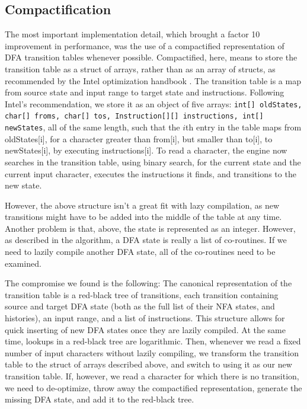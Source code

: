 \documentclass[english,twocolumn]{article}
\theoremstyle{definition}
\newcommand{\seclabel}[1]{\label{sec:#1}}
\begin{document}
\subsection{Compactification}
\seclabel{compact}
The most important implementation detail, which brought a factor 10
improvement in performance, was the use of a compactified representation
of DFA transition tables whenever possible.  Compactified, here,
means to store the transition table as a struct of arrays, rather
than as an array of structs, as recommended by the Intel optimization
handbook \cite[section 6.5.1]{Inte13a}.  The transition table is a
map from source state and input range to target state and instructions.
Following Intel's recommendation, we store it as an object of five
arrays: \texttt{int[] oldStates, char[] froms,  char[] tos,
Instruction[][] instructions, int[] newStates}, all of the same
length, such that the $i$th entry in the table maps from oldStates[i],
for a character greater than from[i], but smaller than to[i], to
newStates[i], by executing instructions[i].  To read a character,
the engine now searches in the transition table, using binary search,
for the current state and the current input character, executes the
instructions it finds, and transitions to the new state.

However, the above structure isn't a great fit with lazy compilation,
as new transitions might have to be added into the middle of the
table at any time.  Another problem is that, above, the state is
represented as an integer.  However, as described in the algorithm,
a DFA state is really a list of co-routines. If we need to lazily compile
another DFA state, all of the co-routines need to be examined.

The compromise we found is the following: The canonical representation
of the transition table is a red-black tree of transitions, each
transition containing source and target DFA state (both as the full
list of their NFA states, and histories), an input range, and a
list of instructions. This structure allows for quick inserting of
new DFA states once they are lazily compiled.  At the same time,
lookups in a red-black tree are logarithmic.  Then, whenever we
read a fixed number of input characters without lazily compiling,
we transform the transition table to the struct of arrays described
above, and switch to using it as our new transition table.
If, however, we read a character for which there is no transition, we need to
de-optimize, throw away the compactified representation, 
generate the missing DFA state, and add it to the red-black tree.
\end{document}
